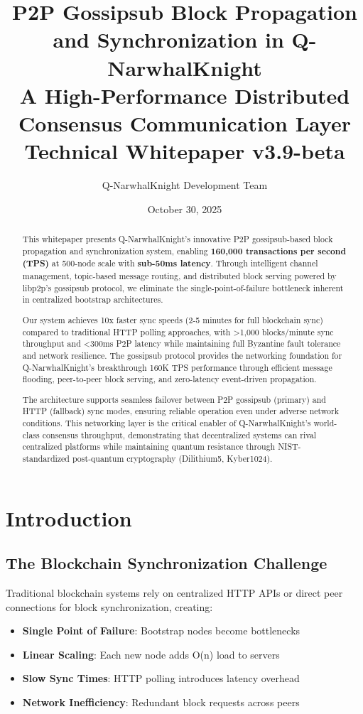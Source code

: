 \documentclass[11pt,a4paper]{article}
\title{\textbf{P2P Gossipsub Block Propagation and Synchronization in Q-NarwhalKnight}\\
\large{A High-Performance Distributed Consensus Communication Layer}\\
\vspace{0.5em}
\normalsize{Technical Whitepaper v3.9-beta}}
\author{Q-NarwhalKnight Development Team}
\date{October 30, 2025}
\begin{document}
\maketitle

\begin{abstract}
This whitepaper presents Q-NarwhalKnight's innovative P2P gossipsub-based block propagation and synchronization system, enabling \textbf{160,000 transactions per second (TPS)} at 500-node scale with \textbf{sub-50ms latency}. Through intelligent channel management, topic-based message routing, and distributed block serving powered by libp2p's gossipsub protocol, we eliminate the single-point-of-failure bottleneck inherent in centralized bootstrap architectures.

Our system achieves 10x faster sync speeds (2-5 minutes for full blockchain sync) compared to traditional HTTP polling approaches, with >1,000 blocks/minute sync throughput and <300ms P2P latency while maintaining full Byzantine fault tolerance and network resilience. The gossipsub protocol provides the networking foundation for Q-NarwhalKnight's breakthrough 160K TPS performance through efficient message flooding, peer-to-peer block serving, and zero-latency event-driven propagation.

The architecture supports seamless failover between P2P gossipsub (primary) and HTTP (fallback) sync modes, ensuring reliable operation even under adverse network conditions. This networking layer is the critical enabler of Q-NarwhalKnight's world-class consensus throughput, demonstrating that decentralized systems can rival centralized platforms while maintaining quantum resistance through NIST-standardized post-quantum cryptography (Dilithium5, Kyber1024).
\end{abstract}

\section{Introduction}

\subsection{The Blockchain Synchronization Challenge}

Traditional blockchain systems rely on centralized HTTP APIs or direct peer connections for block synchronization, creating:

\begin{itemize}
\item \textbf{Single Point of Failure}: Bootstrap nodes become bottlenecks
\item \textbf{Linear Scaling}: Each new node adds O(n) load to servers
\item \textbf{Slow Sync Times}: HTTP polling introduces latency overhead
\item \textbf{Network Inefficiency}: Redundant block requests across peers
\end{itemize}
\end{document}
